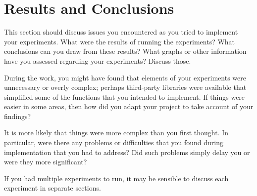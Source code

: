\chapter{Results and Conclusions}

This section should discuss issues you encountered as you tried to implement your experiments. What were the results of running the experiments? What conclusions can you draw from these results? What graphs or other information have you assessed regarding your experiments? Discuss those.

During the work, you might have found that elements of your experiments were unnecessary or overly complex; perhaps third-party libraries were available that simplified some of the functions that you intended to implement. If things were easier in some areas, then how did you adapt your project to take account of your findings?

It is more likely that things were more complex than you first thought. In particular, were there any problems or difficulties that you found during implementation that you had to address? Did such problems simply delay you or were they more significant?

If you had multiple experiments to run, it may be sensible to discuss each experiment in separate sections.
